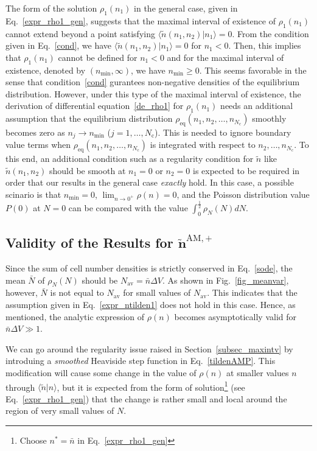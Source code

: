 \documentclass{article}
\newcommand{\dV}{{\Delta V}}
\newcommand{\Nc}{{N_\mathrm{c}}}
\newcommand{\nb}{\bar{n}}
\newcommand{\Nav}{{N_\mathrm{av}}}
\begin{document}
The form of the solution $\rho_1(n_1)$ in the general case, given in Eq.~\eqref{expr_rho1_gen}, suggests that the maximal interval of existence of $\rho_1(n_1)$ cannot extend beyond a point satisfying $\langle\tilde{n}(n_1,n_2)|n_1\rangle=0$.
From the condition given in Eq.~\eqref{cond}, we have $\langle\tilde{n}(n_1,n_2)|n_1\rangle=0$ for $n_1<0$.
Then, this implies that $\rho_1(n_1)$ cannot be defined for $n_1<0$ and for the maximal interval of existence, denoted by $(n_\mathrm{min},\infty)$, we have $n_\mathrm{min}\ge0$.
This seems favorable in the sense that condition~\eqref{cond} gurantees non-negative densities of the equilibrium distribution.
However, under this type of the maximal interval of existence, the derivation of differential equation~\eqref{de_rho1} for $\rho_1(n_1)$ needs an additional assumption that the equilibrium distribution $\rho_\mathrm{eq}(n_1,n_2,\dots,n_\Nc)$ smoothly becomes zero as $n_j\rightarrow n_\mathrm{min}$ ($j=1,\dots,\Nc$).
This is needed to ignore boundary value terms when $\rho_\mathrm{eq}(n_1,n_2,\dots,n_\Nc)$ is integrated with respect to $n_2,\dots,n_\Nc$.
To this end, an additional condition such as a regularity condition for $\tilde{n}$ like $\tilde{n}(n_1,n_2)$ should be smooth at $n_1=0$ or $n_2=0$ is expected to be required in order that our results in the general case \textit{exactly} hold.
In this case, a possible scinario is that $n_\mathrm{min}=0$, $\lim_{n\rightarrow 0^+}\rho(n)=0$, and the Poisson distribution value $P(0)$ at $N=0$ can be compared with the value $\int_0^{\frac{1}{2}}\rho_N(N)dN$.

\subsection{Validity of the Results for $\bm{\tilde{n}^\mathrm{AM,+}}$}

Since the sum of cell number densities is strictly conserved in Eq.~\eqref{sode}, the mean $\bar{N}$ of $\rho_N(N)$ should be $\Nav=\nb\dV$.
As shown in Fig.~\ref{fig_meanvar}, however, $\bar{N}$ is not equal to $\Nav$ for small values of $\Nav$.
This indicates that the assumption given in Eq.~\eqref{expr_ntilden1} does not hold in this case.
Hence, as mentioned, the analytic expression of $\rho(n)$ becomes asymptotically valid for $\nb\dV\gg 1$.

We can go around the regularity issue raised in Section~\ref{subsec_maxintv} by introduing a \textit{smoothed} Heaviside step function in Eq.~\eqref{tildenAMP}.
This modification will cause some change in the value of $\rho(n)$ at smaller values $n$ through $\langle\tilde{n}|n\rangle$, but it is expected from the form of solution\footnote{Choose $n^*=\nb$ in Eq.~\eqref{expr_rho1_gen}} (see Eq.~\eqref{expr_rho1_gen}) that the change is rather small and local around the region of very small values of $N$.
\end{document}
